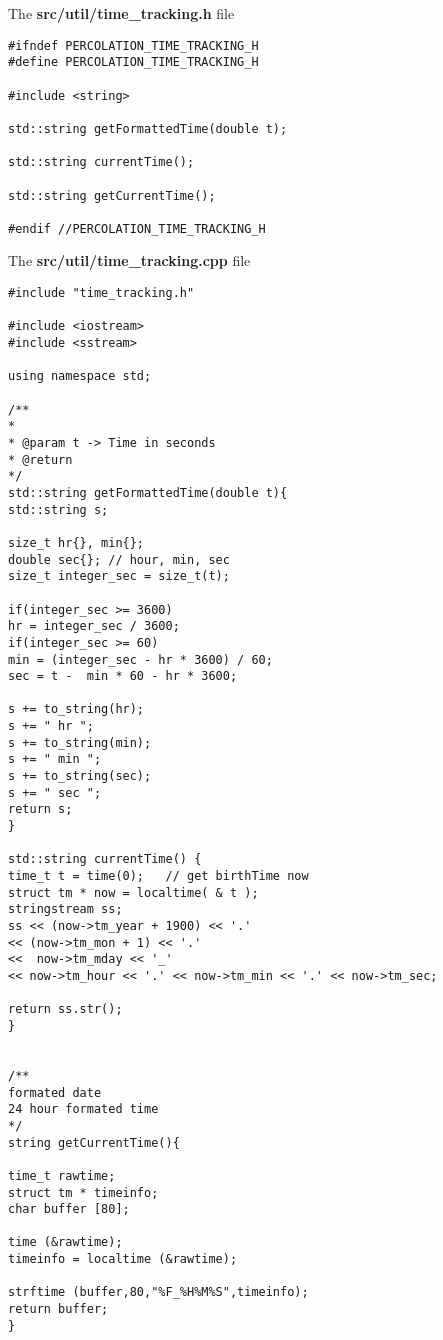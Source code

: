 

The \textbf{src/util/time_tracking.h} file

\begin{lstlisting}[style=CStyle]
#ifndef PERCOLATION_TIME_TRACKING_H
#define PERCOLATION_TIME_TRACKING_H

#include <string>

std::string getFormattedTime(double t);

std::string currentTime();

std::string getCurrentTime();

#endif //PERCOLATION_TIME_TRACKING_H
\end{lstlisting}

The \textbf{src/util/time_tracking.cpp} file

\begin{lstlisting}[style=CStyle]
#include "time_tracking.h"

#include <iostream>
#include <sstream>

using namespace std;

/**
*
* @param t -> Time in seconds
* @return
*/
std::string getFormattedTime(double t){
std::string s;

size_t hr{}, min{};
double sec{}; // hour, min, sec
size_t integer_sec = size_t(t);

if(integer_sec >= 3600)
hr = integer_sec / 3600;
if(integer_sec >= 60)
min = (integer_sec - hr * 3600) / 60;
sec = t -  min * 60 - hr * 3600;

s += to_string(hr);
s += " hr ";
s += to_string(min);
s += " min ";
s += to_string(sec);
s += " sec ";
return s;
}

std::string currentTime() {
time_t t = time(0);   // get birthTime now
struct tm * now = localtime( & t );
stringstream ss;
ss << (now->tm_year + 1900) << '.'
<< (now->tm_mon + 1) << '.'
<<  now->tm_mday << '_'
<< now->tm_hour << '.' << now->tm_min << '.' << now->tm_sec;

return ss.str();
}


/**
formated date
24 hour formated time
*/
string getCurrentTime(){

time_t rawtime;
struct tm * timeinfo;
char buffer [80];

time (&rawtime);
timeinfo = localtime (&rawtime);

strftime (buffer,80,"%F_%H%M%S",timeinfo);
return buffer;
}
\end{lstlisting}